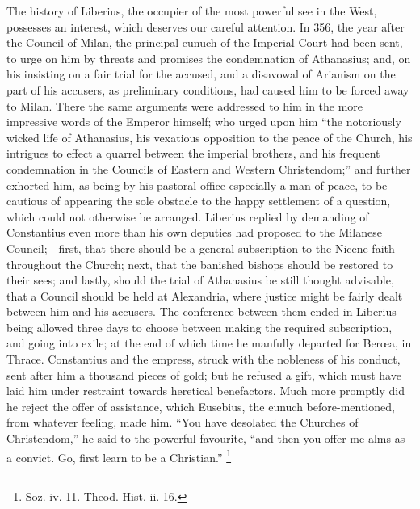 The history of Liberius, the occupier of the most powerful see in
the West, possesses an interest, which deserves our careful attention.
In 356, the year after the Council of Milan, the principal eunuch of
the Imperial Court had been sent, to urge on him by threats and
promises the condemnation of Athanasius; and, on his insisting on a
fair trial for the accused, and a disavowal of Arianism on the part of
his accusers, as preliminary conditions, had caused him to be forced
away to Milan. There the same arguments were addressed to him in the
more impressive words of the Emperor himself; who urged upon him
``the notoriously wicked life of Athanasius, his vexatious
opposition to the peace of the Church, his intrigues to effect a
quarrel between the imperial brothers, and his frequent condemnation
in the Councils of Eastern and Western Christendom;'' and further
exhorted him, as being by his pastoral office especially a man of
peace, to be cautious of appearing the sole obstacle to the happy
settlement of a question, which could not otherwise be arranged.
Liberius replied by demanding of Constantius even more than his own
deputies had proposed to the Milanese Council;—first, that
there should be a general subscription to the Nicene faith throughout
the Church; next, that the banished bishops should be restored to
their sees; and lastly, should the trial of Athanasius be still
thought advisable, that a Council should be held at Alexandria, where
justice might be fairly dealt between him and his accusers. The
conference between them ended in Liberius being allowed three days to
choose between making the required subscription, and going into exile;
at the end of which time he manfully departed for Berœa, in Thrace.
Constantius and the empress, struck with the nobleness of his conduct,
sent after him a thousand pieces of gold; but he refused a gift, which
must have laid him under restraint towards heretical benefactors. Much
more promptly did he reject the offer of assistance, which Eusebius,
the eunuch before-mentioned, from whatever feeling, made him.
``You have desolated the Churches of Christendom,'' he said to
the powerful favourite, ``and then you offer me alms as a convict.
Go, first learn to be a Christian.'' \footnote{Soz. iv. 11. Theod. Hist. ii. 16.}

